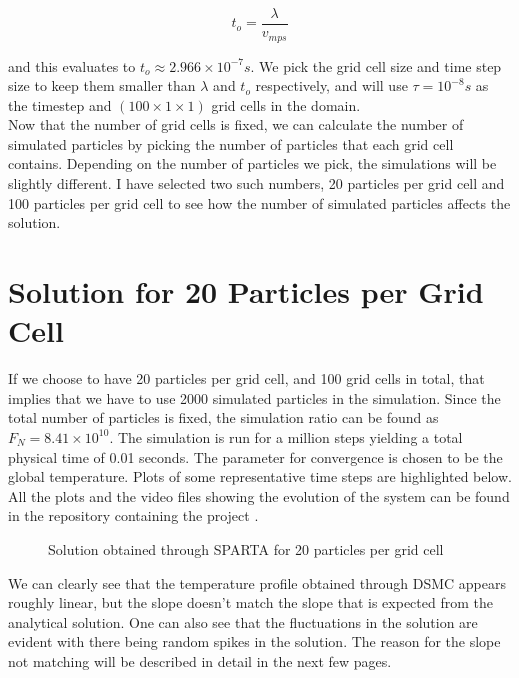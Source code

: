 \begin{equation} \label{eq:mean_coll_time}
	t_o =  \frac{\lambda}{v_{mps}}
\end{equation}

\no and this evaluates to $t_o \approx 2.966 \times 10^{-7} s$. We pick the grid cell size and time step size to keep them smaller than $\lambda$ and $t_o$ respectively, and will use $\tau = 10^{-8} s$ as the timestep and $(100 \times 1 \times 1) $ grid cells in the domain. \\

\no Now that the number of grid cells is fixed, we can calculate the number of simulated particles by picking the number of particles that each grid cell contains. Depending on the number of particles we pick, the simulations will be slightly different. I have selected two such numbers, 20 particles per grid cell and 100 particles per grid cell to see how the number of simulated particles affects the solution.

\section{Solution for 20 Particles per Grid Cell}

If we choose to have 20 particles per grid cell, and 100 grid cells in total, that implies that we have to use 2000 simulated particles in the simulation. Since the total number of particles is fixed, the simulation ratio can be found as $F_N = 8.41 \times 10^{10} $. The simulation is run for a million steps yielding a total physical time of 0.01 seconds. The parameter for convergence is chosen to be the global temperature. Plots of some representative time steps are highlighted below. All the plots and the video files showing the evolution of the system can be found in the repository containing the project \cite{Raghuveeran_Work_During_Summer_2024}.

\begin{figure}[H]
	\centering
    
    \caption{Solution obtained through SPARTA for 20 particles per grid cell}
	\label{gra:kn0.1_20ppgc_100g}
\end{figure}

\no We can clearly see that the temperature profile obtained through DSMC appears roughly linear, but the slope doesn't match the slope that is expected from the analytical solution. One can also see that the fluctuations in the solution are evident with there being random spikes in the solution. The reason for the slope not matching will be described in detail in the next few pages.


